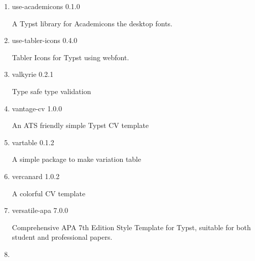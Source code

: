 \begin{enumerate}

  { upb-corporate-design-slides } { 0.1.1 }

  Presentation template for Paderborn University (UPB)
\item
  \href{/universe/package/use-academicons/}{}

  { use-academicons } { 0.1.0 }

  A Typst library for Academicons the desktop fonts.
\item
  \href{/universe/package/use-tabler-icons/}{}

  { use-tabler-icons } { 0.4.0 }

  Tabler Icons for Typst using webfont.
\item
  \href{/universe/package/valkyrie/}{}

  { valkyrie } { 0.2.1 }

  Type safe type validation
\item
  \href{/universe/package/vantage-cv/}{}


  { vantage-cv } { 1.0.0 }

  An ATS friendly simple Typst CV template
\item
  \href{/universe/package/vartable/}{}

  { vartable } { 0.1.2 }

  A simple package to make variation table
\item
  \href{/universe/package/vercanard/}{}


  { vercanard } { 1.0.2 }

  A colorful CV template
\item
  \href{/universe/package/versatile-apa/}{}


  { versatile-apa } { 7.0.0 }

  Comprehensive APA 7th Edition Style Template for Typst, suitable for
  both student and professional papers.
\item
  \href{/universe/package/vienna-tech/}{}


\end{enumerate}
